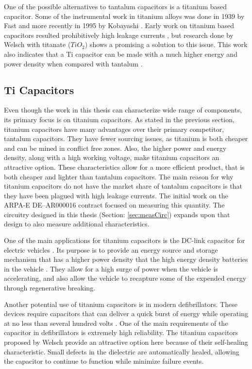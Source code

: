 One of the possible alternatives to tantalum capacitors is a titanium based capacitor. Some of the instrumental work in titanium alloys was done in 1939 by Fast \cite{fast1939transition} and more recently in 1995 by Kobayashi \cite{kobayashi1995mechanical}\cite{corwin2013synthesis}. Early work on titanium based capacitors resulted prohibitively high leakage currents \cite{ki2005titanium}, but research done by Welsch \cite{welsch22nd}\cite{welsch2001directionally} with titanate ($TiO_2$) shows a promising a solution to this issue. This work also indicates that a Ti capacitor can be made with a much higher energy and power density when compared with tantalum \cite{steve_thesis}.


\subsection{Ti Capacitors}

Even though the work in this thesis can characterize wide range of components, its primary focus is on titanium capacitors. As stated in the previous section, titanium capacitors have many advantages over their primary competitor, tantalum capacitors. They have fewer sourcing issues, as titanium is both cheaper and can be mined in conflict free zones. Also, the higher power and energy density, along with a high working voltage, make titanium capacitors an attractive option. These characteristics allow for a more efficient product, that is both cheaper and lighter than tantalum capacitors.  The main reason for why titanium capacitors do not have the market share of tantalum capacitors is that they have been plagued with high leakage currents. The initial work on the ARPA-E DE--AR000016 contract \cite{steve_thesis} focused on measuring this quantity. The circuitry designed in this thesis (Section: \ref{sec:measCirc}) expands upon that design to also measure additional characteristics.

One of the main applications for titanium capacitors is the DC-link capacitor for electric vehicles \cite{dclink}. Its purpose is to provide an energy source and storage mechanism that has a higher power density that the high energy density batteries in the vehicle \cite{thounthong2006control}. They allow for a high surge of power when the vehicle is accelerating, and also allow the vehicle to recapture some of the expended energy through regenerative breaking.

Another potential use of titanium capacitors is in modern defibrillators. These devices require capacitors that can deliver a quick burst of energy while operating at no less than several hundred volts \cite{shephard1961design}\cite{idiot_defibrillator}. One of the main requirements of the capacitor in defibrillators is extremely high reliability. The titanium capacitors proposed by Welsch \cite{welsch22nd} provide an attractive option here because of their self-healing characteristic. Small defects in the dielectric are automatically healed, allowing the capacitor to continue to function while minimize failure events. 


